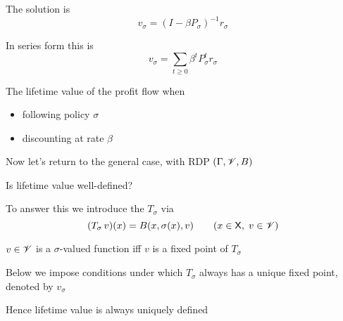 \begin{frame}
    
    The solution is
    \begin{equation*}
        v_\sigma = (I - \beta P_\sigma)^{-1} r_\sigma
    \end{equation*}

              \vspace{0.5em}
              \vspace{0.5em}
    In series form this is
    \begin{equation*}
        v_\sigma = \sum_{t \geq 0} \beta^t P_\sigma^t r_\sigma
    \end{equation*}

              \vspace{0.5em}
              \vspace{0.5em}
    The lifetime value of the profit flow when 
    \begin{itemize}
        \item following policy $\sigma$
              \vspace{0.5em}
        \item discounting at rate $\beta$
    \end{itemize}

\end{frame}

\begin{frame}

    Now let's return to the general case, with RDP $(\Gamma, \mathscr V, B)$

        \vspace{0.5em}
        \vspace{0.5em}
    Is lifetime value well-defined?
        \vspace{0.5em}
        \vspace{0.5em}

    To answer this we introduce the  $T_\sigma$ via
    \begin{equation*}
        (T_\sigma \, v)(x) = B(x, \sigma(x), v)
        \qquad (x \in \mathsf X,\; v \in \mathscr V)
    \end{equation*}

     $v \in \mathscr V$ is a $\sigma$-valued function iff $v$ is a fixed point of
    $T_\sigma$
    
        \vspace{0.5em}
        \vspace{0.5em}

    Below we impose conditions under which $T_\sigma$ always has a unique
    fixed point, denoted by $v_\sigma$

        \vspace{0.5em}
        \vspace{0.5em}
    Hence lifetime value is always uniquely defined


\end{frame}



